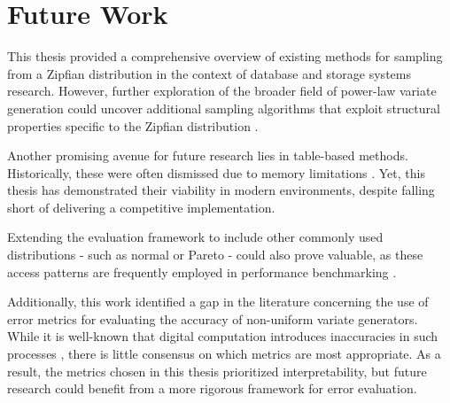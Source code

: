 \chapter{Future Work}\label{chap:future-work}

This thesis provided a comprehensive overview of existing methods for sampling from a Zipfian distribution in the context of 
database and storage systems research. However, further exploration of the broader field of power-law variate generation could 
uncover additional sampling algorithms that exploit structural properties specific to the Zipfian distribution \cite{powersApplicationsExplanationsZipfs1998a}. 

Another promising avenue for future research lies in table-based methods. Historically, these were often dismissed due 
to memory limitations \cite{hormannRejectioninversionGenerateVariates1996}. Yet, this thesis has demonstrated their viability 
in modern environments, despite falling short of delivering a competitive implementation.

Extending the evaluation framework to include other commonly used distributions - such as normal or Pareto - could also prove valuable, 
as these access patterns are frequently employed in performance benchmarking \cite{cooperBenchmarkingCloudServing2010}. 

Additionally, this work identified a gap in the literature concerning the use of error metrics for evaluating the accuracy of non-uniform variate generators. 
While it is well-known that digital computation introduces inaccuracies in such processes \cite{radicchiUnderestimatingExtremeEvents2014,leydoldErrorDetectionNonUniforma,monahanAccuracyRandomNumber1985},
there is little consensus on which metrics are most appropriate. As a result, the metrics chosen in this thesis prioritized interpretability, but future research could benefit from a more rigorous framework for error evaluation.